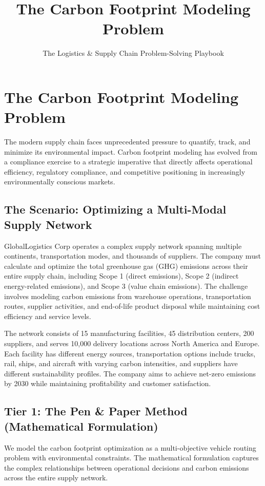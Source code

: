 \documentclass{article}
\title{The Carbon Footprint Modeling Problem}
\author{The Logistics \& Supply Chain Problem-Solving Playbook}
\date{}
\begin{document}
\maketitle

\section{The Carbon Footprint Modeling Problem}

The modern supply chain faces unprecedented pressure to quantify, track, and minimize its environmental impact. Carbon footprint modeling has evolved from a compliance exercise to a strategic imperative that directly affects operational efficiency, regulatory compliance, and competitive positioning in increasingly environmentally conscious markets.

\subsection{The Scenario: Optimizing a Multi-Modal Supply Network}

GlobalLogistics Corp operates a complex supply network spanning multiple continents, transportation modes, and thousands of suppliers. The company must calculate and optimize the total greenhouse gas (GHG) emissions across their entire supply chain, including Scope 1 (direct emissions), Scope 2 (indirect energy-related emissions), and Scope 3 (value chain emissions). The challenge involves modeling carbon emissions from warehouse operations, transportation routes, supplier activities, and end-of-life product disposal while maintaining cost efficiency and service levels.

The network consists of 15 manufacturing facilities, 45 distribution centers, 200 suppliers, and serves 10,000 delivery locations across North America and Europe. Each facility has different energy sources, transportation options include trucks, rail, ships, and aircraft with varying carbon intensities, and suppliers have different sustainability profiles. The company aims to achieve net-zero emissions by 2030 while maintaining profitability and customer satisfaction.

\subsection{Tier 1: The Pen \& Paper Method (Mathematical Formulation)}

We model the carbon footprint optimization as a multi-objective vehicle routing problem with environmental constraints. The mathematical formulation captures the complex relationships between operational decisions and carbon emissions across the entire supply network.
\end{document}
